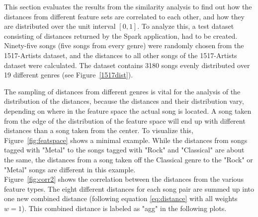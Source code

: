 This section evaluates the results from the similarity analysis to find out how the distances from different feature sets are correlated to each other, and how they are distributed over the unit interval $[0,1]$.
\noindent To analyze this, a test dataset consisting of distances returned by the Spark application, had to be created. Ninety-five songs (five songs from every genre) were randomly chosen from the 1517-Artists dataset, and the distances to all other songs of the 1517-Artists dataset were calculated. The dataset contains 3180 songs evenly distributed over 19 different genres (see Figure~\ref{1517dist}).
\begin{figure}[htbp]
	\centering
\end{figure}%
\FloatBarrier

\noindent The sampling of distances from different genres is vital for the analysis of the distribution of the distances, because the distances and their distribution vary, depending on where in the feature space the actual song is located. 
\noindent A song taken from the edge of the distribution of the feature space will end up with different distances than a song taken from the center. To visualize this, Figure~\ref{fig:featspace} shows a minimal example. While the distances from songs tagged with "Metal" to the songs tagged with "Rock" and "Classical" are about the same, the distances from a song taken off the Classical genre to the "Rock" or "Metal" songs are different in this example.\\ 
\noindent Figure~\ref{fig:corr2} shows the correlation between the distances from the various feature types. The eight different distances for each song pair are summed up into one new combined distance (following equation \eqref{eq:distance} with all weights $w = 1$). This combined distance is labeled as "agg" in the following plots.

